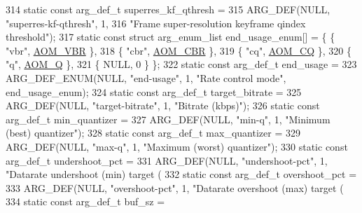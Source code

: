 \begin{DoxyCodeInclude}
{{{314 \textcolor{keyword}{static} \textcolor{keyword}{const} arg\_def\_t superres\_kf\_qthresh =
315     ARG\_DEF(NULL, \textcolor{stringliteral}{"superres-kf-qthresh"}, 1,
316             \textcolor{stringliteral}{"Frame super-resolution keyframe qindex threshold"});
317 \textcolor{keyword}{static} \textcolor{keyword}{const} \textcolor{keyword}{struct }arg\_enum\_list end\_usage\_enum[] = \{ \{ \textcolor{stringliteral}{"vbr"}, \hyperlink{group__encoder_gga7c084d3ecef569aad166ce70b0e8a957a7d3a2574737ea63d0f160ffdbd7f0110}{AOM\_VBR} \},
318                                                        \{ \textcolor{stringliteral}{"cbr"}, \hyperlink{group__encoder_gga7c084d3ecef569aad166ce70b0e8a957a14b6057d61c61e6117f5af16dcf89b0c}{AOM\_CBR} \},
319                                                        \{ \textcolor{stringliteral}{"cq"}, \hyperlink{group__encoder_gga7c084d3ecef569aad166ce70b0e8a957a70aa1f15e91f6576ba3e63879947be64}{AOM\_CQ} \},
320                                                        \{ \textcolor{stringliteral}{"q"}, \hyperlink{group__encoder_gga7c084d3ecef569aad166ce70b0e8a957aff3bbd4fe870b4b946c2093e59eb14e5}{AOM\_Q} \},
321                                                        \{ NULL, 0 \} \};
322 \textcolor{keyword}{static} \textcolor{keyword}{const} arg\_def\_t end\_usage =
323     ARG\_DEF\_ENUM(NULL, \textcolor{stringliteral}{"end-usage"}, 1, \textcolor{stringliteral}{"Rate control mode"}, end\_usage\_enum);
324 \textcolor{keyword}{static} \textcolor{keyword}{const} arg\_def\_t target\_bitrate =
325     ARG\_DEF(NULL, \textcolor{stringliteral}{"target-bitrate"}, 1, \textcolor{stringliteral}{"Bitrate (kbps)"});
326 \textcolor{keyword}{static} \textcolor{keyword}{const} arg\_def\_t min\_quantizer =
327     ARG\_DEF(NULL, \textcolor{stringliteral}{"min-q"}, 1, \textcolor{stringliteral}{"Minimum (best) quantizer"});
328 \textcolor{keyword}{static} \textcolor{keyword}{const} arg\_def\_t max\_quantizer =
329     ARG\_DEF(NULL, \textcolor{stringliteral}{"max-q"}, 1, \textcolor{stringliteral}{"Maximum (worst) quantizer"});
330 \textcolor{keyword}{static} \textcolor{keyword}{const} arg\_def\_t undershoot\_pct =
331     ARG\_DEF(NULL, \textcolor{stringliteral}{"undershoot-pct"}, 1, \textcolor{stringliteral}{"Datarate undershoot (min) target (%
332 \textcolor{keyword}{static} \textcolor{keyword}{const} arg\_def\_t overshoot\_pct =
333     ARG\_DEF(NULL, \textcolor{stringliteral}{"overshoot-pct"}, 1, \textcolor{stringliteral}{"Datarate overshoot (max) target (%
334 \textcolor{keyword}{static} \textcolor{keyword}{const} arg\_def\_t buf\_sz =
}}}}}
\end{DoxyCodeInclude}
